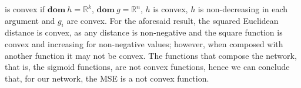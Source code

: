 \begin{itemize}
                is convex if $\mathbf{dom} \ h = \mathbb{R}^k$, $\mathbf{dom} \ g = \mathbb{R}^n$, $h$ is convex,
                $h$ is non-decreasing in each argument and $g_i$ are convex. For the aforesaid result, the squared
                Euclidean distance is convex, as any distance is non-negative and the square function is convex and
                increasing for non-negative values; however, when composed with another function it may not be
                convex. The functions that compose the network, that is, the sigmoid functions, are not convex
                functions, hence we can conclude that, for our network, the MSE is a not convex function.
            \end{itemize}


